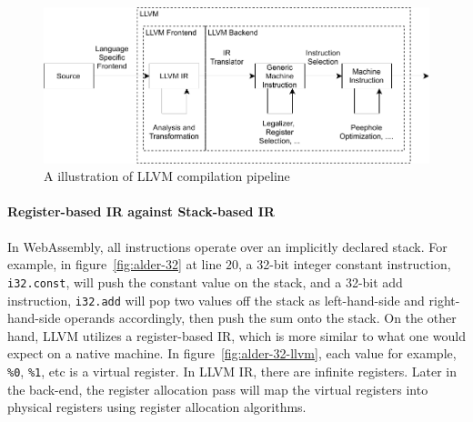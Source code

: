 \begin{figure}
  \centering
  \includegraphics{Images/llvm-intro.pdf}
  \caption{A illustration of LLVM compilation pipeline}
  \label{fig:llvm-intro}
\end{figure}


\paragraph{Register-based IR against Stack-based IR}
In WebAssembly, all instructions operate over an implicitly declared stack. For example, in figure~\ref{fig:alder-32} at line $20$, a 32-bit integer constant instruction, \texttt{i32.const}, will push the constant value on the stack, and a 32-bit add instruction, \texttt{i32.add} will pop two values off the stack as left-hand-side and right-hand-side operands accordingly, then push the sum onto the stack. On the other hand, LLVM utilizes a register-based IR, which is more similar to what one would expect on a native machine. In figure~\ref{fig:alder-32-llvm}, each value for example, \texttt{\%0}, \texttt{\%1}, etc is a virtual register. In LLVM IR, there are infinite registers. Later in the back-end, the register allocation pass will map the virtual registers into physical registers using register allocation algorithms.

